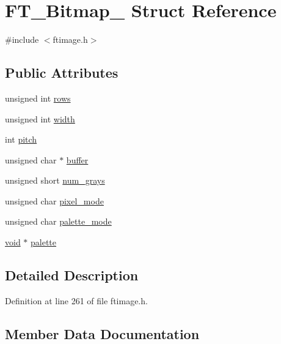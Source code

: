 \hypertarget{struct_f_t___bitmap__}{}\section{F\+T\+\_\+\+Bitmap\+\_\+ Struct Reference}
\label{struct_f_t___bitmap__}


{\ttfamily \#include $<$ftimage.\+h$>$}

\subsection*{Public Attributes}
\begin{DoxyCompactItemize}
\item 
unsigned int \mbox{\hyperlink{struct_f_t___bitmap___ad857f33f4d12be88746072a7e1455270}{rows}}
\item 
unsigned int \mbox{\hyperlink{struct_f_t___bitmap___a4a3dd62109eb0371f4ca8d196f713e4b}{width}}
\item 
int \mbox{\hyperlink{struct_f_t___bitmap___afdee595846e1188c7a76d0cec9d85cf2}{pitch}}
\item 
unsigned char $\ast$ \mbox{\hyperlink{struct_f_t___bitmap___a76439b1d3c13b81ca506108cd1623284}{buffer}}
\item 
unsigned short \mbox{\hyperlink{struct_f_t___bitmap___a2465f41f8badacca572203c4bdb473e3}{num\+\_\+grays}}
\item 
unsigned char \mbox{\hyperlink{struct_f_t___bitmap___a9bf1180f0b73c4161305ff0166f2652f}{pixel\+\_\+mode}}
\item 
unsigned char \mbox{\hyperlink{struct_f_t___bitmap___a46b396401785e1cd90066f9cd11507f6}{palette\+\_\+mode}}
\item 
\mbox{\hyperlink{_s_d_l__opengles2__gl2ext_8h_ae5d8fa23ad07c48bb609509eae494c95}{void}} $\ast$ \mbox{\hyperlink{struct_f_t___bitmap___a8d5ecf4409f71bfb559e0d13d8df4d86}{palette}}
\end{DoxyCompactItemize}


\subsection{Detailed Description}


Definition at line 261 of file ftimage.\+h.



\subsection{Member Data Documentation}
\mbox{\label{struct_f_t___bitmap___a76439b1d3c13b81ca506108cd1623284}} 

